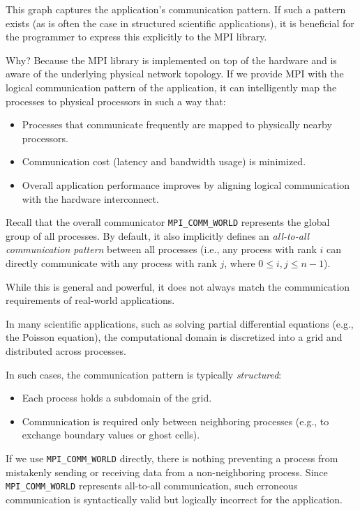 \documentclass[12pt]{book}
\begin{document}
This graph captures the application's communication pattern. If such a pattern exists (as is often the case in structured scientific applications), it is beneficial for the programmer to express this explicitly to the MPI library.

Why? Because the MPI library is implemented on top of the hardware and is aware of the underlying physical network topology. If we provide MPI with the logical communication pattern of the application, it can intelligently map the processes to physical processors in such a way that:
\begin{itemize}
    \item Processes that communicate frequently are mapped to physically nearby processors.
    \item Communication cost (latency and bandwidth usage) is minimized.
    \item Overall application performance improves by aligning logical communication with the hardware interconnect.
\end{itemize}

Recall that the overall communicator \texttt{MPI\_COMM\_WORLD} represents the global group of all processes. By default, it also implicitly defines an \emph{all-to-all communication pattern} between all processes (i.e., any process with rank $i$ can directly communicate with any process with rank $j$, where $0 \leq i,j \leq n-1$).

While this is general and powerful, it does not always match the communication requirements of real-world applications.  

In many scientific applications, such as solving partial differential equations (e.g., the Poisson equation), the computational domain is discretized into a grid and distributed across processes.  

In such cases, the communication pattern is typically \emph{structured}:
\begin{itemize}
    \item Each process holds a subdomain of the grid.
    \item Communication is required only between neighboring processes (e.g., to exchange boundary values or ghost cells).
\end{itemize}

If we use \texttt{MPI\_COMM\_WORLD} directly, there is nothing preventing a process from mistakenly sending or receiving data from a non-neighboring process. Since \texttt{MPI\_COMM\_WORLD} represents all-to-all communication, such erroneous communication is syntactically valid but logically incorrect for the application.  
\end{document}
